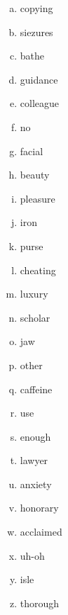 \documentclass[12pt]{article}
\begin{document}
\begin{multicols}{3}
    \begin{enumerate}[a)]
        \item copying
        \item siezures
        \item bathe
        \item guidance
        \item colleague
        \item no
        \item facial
        \item beauty
        \item pleasure
        \item iron
        \item purse
        \item cheating
        \item luxury
        \item scholar
        \item jaw
        \item other
        \item caffeine
        \item use
        \item enough
        \item lawyer
        \item anxiety
        \item honorary
        \item acclaimed
        \item uh-oh
        \item isle
        \item thorough
    \end{enumerate}
\end{multicols}
\end{document}
